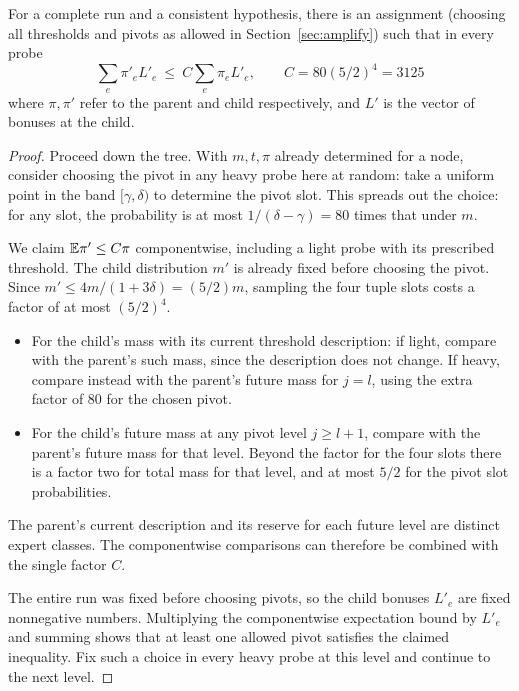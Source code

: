 \begin{lemma}\label{lem:transfer-p}
For a complete run and a consistent hypothesis, there is an
assignment (choosing all thresholds and pivots as allowed in
Section~\ref{sec:amplify}) such that in every probe
\[
        \sum_e \pi'_e L'_e \ \le\ C \sum_e \pi_e L'_e ,
         \qquad C=80(5/2)^4=3125
\]
where \(\pi,\pi'\) refer to the parent and child respectively,
and \(L'\) is the vector of bonuses at the child.
\end{lemma}
\begin{proof}
Proceed down the tree. With \(m,t,\pi\) already determined for a
node, consider choosing the pivot in any heavy probe here at random:
take a uniform point in the band
\([\gamma,\delta)\) to determine the pivot slot.
This spreads out the choice: for any slot, the probability
is at most \(1/(\delta-\gamma)=80\) times that under \(m\).

We claim \(\mathbb E\pi'\le C\pi\) componentwise, including a light probe
with its prescribed threshold. The child distribution \(m'\) is already
fixed before choosing the pivot. Since \(m'\le4m/(1+3\delta)=(5/2)m\),
sampling the four tuple slots costs a factor of at most \((5/2)^4\).

\begin{itemize}
 \item For the child's mass with its current threshold description:
if light, compare with the parent's such mass,
since the description does not change.
If heavy, compare instead with the parent's future mass for
\(j=l\), using the extra factor of 80 for the chosen pivot.
 \item For the child's future mass at any pivot level \(j\ge l+1\),
compare with the parent's future mass for that level.
Beyond the factor for the four slots there is a factor two
for total mass for that level, and at most \(5/2\)
for the pivot slot probabilities.
\end{itemize}
The parent's current description and its reserve for each future
level are distinct expert classes. The componentwise comparisons can
therefore be combined with the single factor \(C\).

The entire run was fixed before choosing pivots, so the child bonuses
\(L'_e\) are fixed nonnegative numbers. Multiplying the componentwise
expectation bound by \(L'_e\) and summing shows that at least one allowed
pivot satisfies the claimed inequality. Fix such a choice in every
heavy probe at this level and continue to the next level.

\end{proof}

